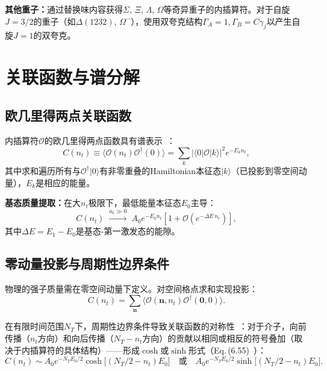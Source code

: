 \documentclass[12pt,a4paper]{ctexart}
\theoremstyle{definition}
\begin{document}
\textbf{其他重子：}通过替换味内容获得$\Sigma$, $\Xi$, $\Lambda$, $\Omega$等奇异重子的内插算符。对于自旋$J=3/2$的重子（如$\Delta(1232)$, $\Omega^-$），使用双夸克结构$\Gamma_A = 1, \Gamma_B = C\gamma_j$以产生自旋$J=1$的双夸克。

\section{关联函数与谱分解}

\subsection{欧几里得两点关联函数}

内插算符$\mathcal{O}$的欧几里得两点函数具有谱表示~\cite{GattringerLang2010}：
\begin{equation}
C(n_t) \equiv \langle \mathcal{O}(n_t) \mathcal{O}^\dagger(0) \rangle = \sum_k |\langle 0|\mathcal{O}|k\rangle|^2 e^{-E_k n_t},
\label{eq:spectral_decomp}
\end{equation}
其中求和遍历所有与$\mathcal{O}^\dagger|0\rangle$有非零重叠的Hamiltonian本征态$|k\rangle$（已投影到零空间动量），$E_k$是相应的能量。

\textbf{基态质量提取：}在大$n_t$极限下，最低能量本征态$E_0$主导：
\begin{equation}
C(n_t) \;\xrightarrow{n_t \gg 0}\; A_0 e^{-E_0 n_t} \left[1 + \mathcal{O}(e^{-\Delta E\, n_t})\right],
\label{eq:ground_state_dominance}
\end{equation}
其中$\Delta E = E_1 - E_0$是基态-第一激发态的能隙。

\subsection{零动量投影与周期性边界条件}

物理的强子质量需在零空间动量下定义。对空间格点求和实现投影：
\begin{equation}
C(n_t) = \sum_{\mathbf{n}} \langle \mathcal{O}(\mathbf{n}, n_t) \mathcal{O}^\dagger(\mathbf{0}, 0) \rangle.
\label{eq:zero_mom_projection}
\end{equation}

在有限时间范围$N_T$下，周期性边界条件导致关联函数的对称性~\cite{GattringerLang2010}：对于介子，向前传播（$n_t$方向）和向后传播（$N_T - n_t$方向）的贡献以相同或相反的符号叠加（取决于内插算符的具体结构）——形成$\cosh$或$\sinh$形式（Eq.\,(6.55)~\cite{GattringerLang2010}）：
\begin{equation}
C(n_t) \sim A_0 e^{-N_T E_0/2} \cosh\big[(N_T/2 - n_t)E_0\big] \quad\text{或}\quad A_0 e^{-N_T E_0/2} \sinh\big[(N_T/2 - n_t)E_0\big].
\label{eq:cosh_sinh}
\end{equation}
\end{document}
